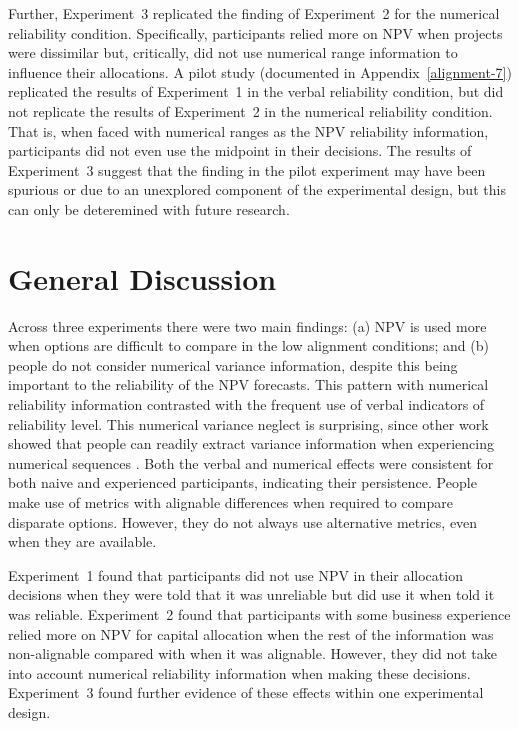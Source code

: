 \documentclass[a4paper, nobind]{templates/ociamthesis}
\theoremstyle{definition}
\theoremstyle{definition}
\theoremstyle{definition}
\theoremstyle{definition}
\theoremstyle{remark}
\begin{document}
Further, Experiment~3 replicated the finding of Experiment~2 for the numerical
reliability condition. Specifically, participants relied more on NPV when
projects were dissimilar but, critically, did not use numerical range
information to influence their allocations. A pilot study (documented in
Appendix~\ref{alignment-7}) replicated the results of Experiment~1 in the
verbal reliability condition, but did not replicate the results of Experiment~2
in the numerical reliability condition. That is, when faced with numerical
ranges as the NPV reliability information, participants did not even use the
midpoint in their decisions. The results of Experiment~3 suggest that the
finding in the pilot experiment may have been spurious or due to an unexplored
component of the experimental design, but this can only be deteremined with
future research.

\section{General Discussion}

Across three experiments there were two main findings: (a) NPV is used more when
options are difficult to compare in the low alignment conditions; and (b) people
do not consider numerical variance information, despite this being important to
the reliability of the NPV forecasts. This pattern with numerical reliability
information contrasted with the frequent use of verbal indicators of reliability
level. This numerical variance neglect is surprising, since other work showed
that people can readily extract variance information when experiencing numerical
sequences \autocite{rosenbaum2020}. Both the verbal and numerical effects were
consistent for both naive and experienced participants, indicating their
persistence. People make use of metrics with alignable differences when required
to compare disparate options. However, they do not always use alternative
metrics, even when they are available.

Experiment~1 found that participants did not use NPV in their allocation
decisions when they were told that it was unreliable but did use it when told it
was reliable. Experiment~2 found that participants with some business experience
relied more on NPV for capital allocation when the rest of the information was
non-alignable compared with when it was alignable. However, they did not take
into account numerical reliability information when making these decisions.
Experiment~3 found further evidence of these effects within one experimental
design.
\end{document}
